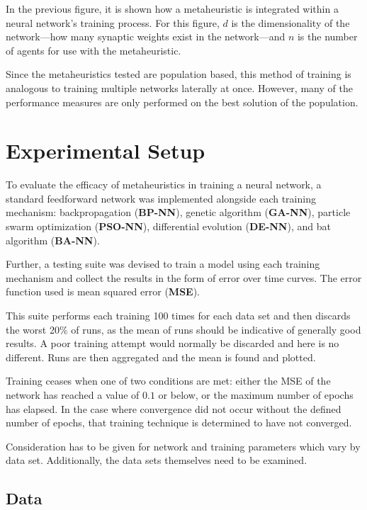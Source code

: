 \documentclass[a4paper,12pt]{article}
\begin{document}
In the previous figure, it is shown how a metaheuristic is integrated within a neural network's training process. For this figure, $d$ is the dimensionality of the network---how many synaptic weights exist in the network---and $n$ is the number of agents for use with the metaheuristic.

Since the metaheuristics tested are population based, this method of training is analogous to training multiple networks laterally at once. However, many of the performance measures are only performed on the best solution of the population.

\section{Experimental Setup}

To evaluate the efficacy of metaheuristics in training a neural network, a standard feedforward network was implemented alongside each training mechanism: backpropagation (\textbf{BP-NN}), genetic algorithm (\textbf{GA-NN}), particle swarm optimization (\textbf{PSO-NN}), differential evolution (\textbf{DE-NN}), and bat algorithm (\textbf{BA-NN}).

\pagebreak

Further, a testing suite was devised to train a model using each training mechanism and collect the results in the form of error over time curves. The error function used is mean squared error (\textbf{MSE}).

This suite performs each training 100 times for each data set and then discards the worst 20\% of runs, as the mean of runs should be indicative of generally good results. A poor training attempt would normally be discarded and here is no different. Runs are then aggregated and the mean is found and plotted.

Training ceases when one of two conditions are met: either the MSE of the network has reached a value of $0.1$ or below, or the maximum number of epochs has elapsed. In the case where convergence did not occur without the defined number of epochs, that training technique is determined to have not converged.

Consideration has to be given for network and training parameters which vary by data set. Additionally, the data sets themselves need to be examined.

\subsection{Data}
\end{document}
